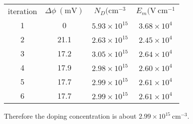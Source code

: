 \documentclass{article}
\begin{document}
\begin{enumerate}
{\begin{tabular}{c | c c c}
iteration & $\Delta \phi ~(\mathrm{mV})$ & $N_D (\mathrm{cm}^{-3}$ & $E_m (\mathrm{V}~\mathrm{cm}^{-1}$ \\
1         & 0                           & $5.93 \times 10^{15}$   & $3.68 \times 10^4$ \\
2         & 21.1                        & $2.63 \times 10^{15}$   & $2.45 \times 10^4$ \\
3         & 17.2                        & $3.05 \times 10^{15}$   & $2.64 \times 10^4$ \\
4         & 17.9                        & $2.98 \times 10^{15}$   & $2.60 \times 10^4$ \\
5         & 17.7                        & $2.99 \times 10^{15}$   & $2.61 \times 10^4$ \\
6         & 17.7                        & $2.99 \times 10^{15}$   & $2.61 \times 10^4$
\end{tabular}

Therefore the doping concentration is about $2.99 \times 10^{15} ~\mathrm{cm}^{-3}.$
}


\end{enumerate}
\end{document}
